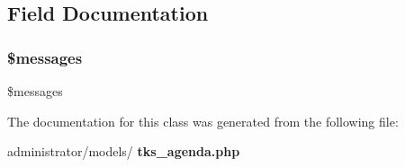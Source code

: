 \subsection{Field Documentation}
\mbox{\label{classtks__agenda_modeltks__agenda_a21a183f927a6d243fe6b4ba3a6c4d4c8}} 
\subsubsection{\$messages}
{\footnotesize\ttfamily \$messages\hspace{0.3cm}{\ttfamily [protected]}}



The documentation for this class was generated from the following file\+:\begin{DoxyCompactItemize}
\item 
administrator/models/\textbf{ tks\+\_\+agenda.\+php}\end{DoxyCompactItemize}
